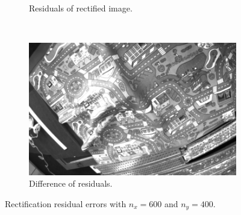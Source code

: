 \begin{figure}[h]
\begin{subfigure}[b]{0.49\textwidth}
    \caption{Residuals of rectified image.}
    \label{fig:rect_rw}
  \end{subfigure}
  \\
  \begin{subfigure}[b]{0.7\textwidth}
    \includegraphics[width=\textwidth]{figures/rect_rdiff.jpg} 
    \caption{Difference of residuals.}
    \label{fig:rect_rdiff}
  \end{subfigure}
  \caption{Rectification residual errors with $n_x = 600$ and $n_y = 400$.}
  \label{fig:rect}
\end{figure}

